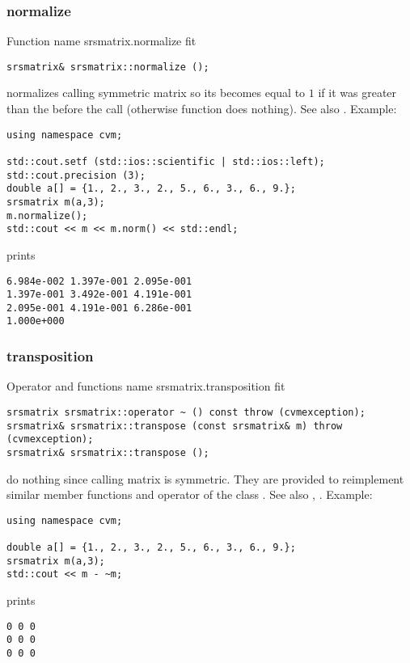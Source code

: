 \subsubsection{normalize}
Function%
\pdfdest name {srsmatrix.normalize} fit
\begin{verbatim}
srsmatrix& srsmatrix::normalize ();
\end{verbatim}
normalizes  calling symmetric matrix so its 
becomes equal to $1$ if it was greater than the 
before the call (otherwise function does nothing).
See also .
Example:
\begin{Verbatim}
using namespace cvm;

std::cout.setf (std::ios::scientific | std::ios::left);
std::cout.precision (3);
double a[] = {1., 2., 3., 2., 5., 6., 3., 6., 9.};
srsmatrix m(a,3);
m.normalize();
std::cout << m << m.norm() << std::endl;
\end{Verbatim}
prints
\begin{Verbatim}
6.984e-002 1.397e-001 2.095e-001
1.397e-001 3.492e-001 4.191e-001
2.095e-001 4.191e-001 6.286e-001
1.000e+000
\end{Verbatim}
\newpage



\subsubsection{transposition}
Operator and functions%
\pdfdest name {srsmatrix.transposition} fit
\begin{verbatim}
srsmatrix srsmatrix::operator ~ () const throw (cvmexception);
srsmatrix& srsmatrix::transpose (const srsmatrix& m) throw (cvmexception);
srsmatrix& srsmatrix::transpose ();
\end{verbatim}
do nothing since calling matrix is symmetric.
They are provided to reimplement similar member functions and operator
of the class .
See also , .
Example:
\begin{Verbatim}
using namespace cvm;

double a[] = {1., 2., 3., 2., 5., 6., 3., 6., 9.};
srsmatrix m(a,3);
std::cout << m - ~m;
\end{Verbatim}
prints
\begin{Verbatim}
0 0 0
0 0 0
0 0 0
\end{Verbatim}
\newpage




